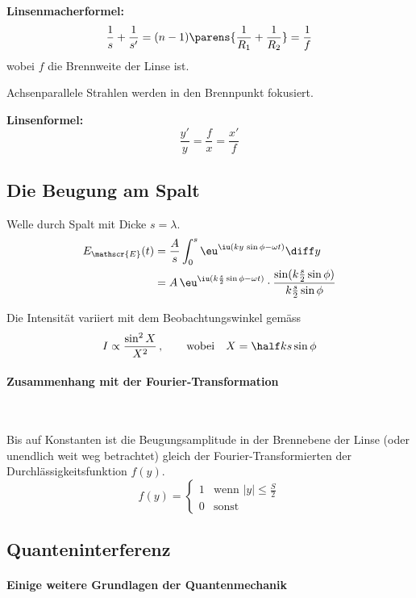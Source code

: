 			\textbf{Linsenmacherformel:}
			\[
				\frac 1 s + \frac 1 {s'} = (n-1) \parens{\frac{1}{R_1} + \frac{1}{R_2}} = \frac 1 f
			\]
			wobei $f$ die Brennweite der Linse ist.
			
			Achsenparallele Strahlen werden in den Brennpunkt fokusiert.
			
			\textbf{Linsenformel:}
			\[
				\frac{y'}{y} = \frac f x = \frac{x'}{f}
			\]
	\subsection{Die Beugung am Spalt} %
		Welle durch Spalt mit Dicke $s=\lambda$.
		\begin{align*}
			E_\mathscr{E}(t) &= \frac A s \int_0^s \eu^{\iu(ky \,\sin \phi - \omega t)} \diff y \\
			&= A \,\eu^{\iu(k \frac s 2 \sin \phi - \omega t)} \cdot \frac{\sin(k \frac s 2 \sin \phi)}{k \frac s 2 \sin \phi}
		\end{align*}
		
		Die Intensität variiert mit dem Beobachtungswinkel gemäss
		\[
			I \propto \frac{\sin^2 X}{X^2} \,,\qquad \text{wobei} \quad X = \half k s \sin \phi
		\]
		
		\begin{center}
			
		\end{center}
		
		\paragraph{Zusammenhang mit der Fourier-Transformation} %
			~
			
			Bis auf Konstanten ist die Beugungsamplitude in der Brennebene der Linse (oder unendlich weit weg betrachtet) gleich der Fourier-Transformierten der Durchlässigkeitsfunktion $f(y)$.
			\[
				f(y) = \left\{\begin{array}{rl}
					1 & \text{wenn } |y| \le \frac S 2 \\
					0 & \text{sonst}
				\end{array}\right.
			\]
	\subsection{Quanteninterferenz} %
		\paragraph{Einige weitere Grundlagen der Quantenmechanik} %
			~
		
